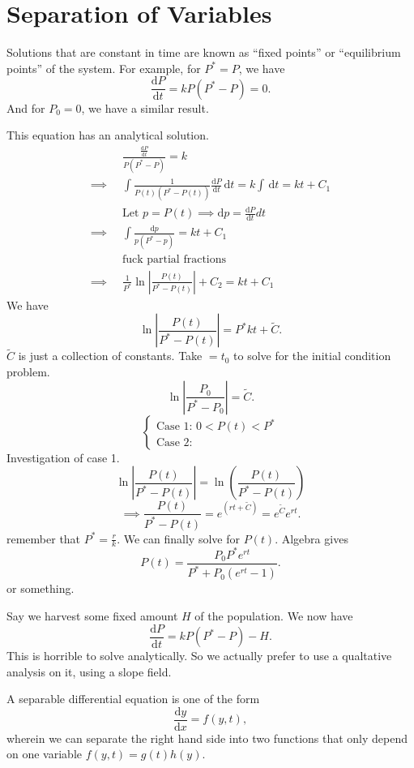 \section{Separation of Variables}
Solutions that are constant in time are known as ``fixed points'' or ``equilibrium points'' of the system. For example, for $P^*= P$, we have
\[
	\frac{\mathrm{d}P}{\mathrm{d}t} =kP(P^*-P)=0
.\]
And for $P_0=0$, we have a similar result.

This equation has an analytical solution.
\begin{align*}
	\qquad& \frac{\frac{\mathrm{d}P}{\mathrm{d}t} }{P\left( P^* - P \right) }=k\\
	\implies& \int \frac{1}{P(t)\left( P^*-P(t) \right) }\frac{\mathrm{d}P}{\mathrm{d}t}  \,\mathrm{d} t=k\int  \,\mathrm{d} t = kt+C_1\\
		&\text{Let }p=P(t) \implies\mathrm{d} p=\frac{\mathrm{d}P}{\mathrm{d}t} dt\\
	\implies&\int \frac{\mathrm{d}p }{p\left( P^*-p \right) }=kt+C_1\\
		&\text{fuck partial fractions}\\
	\implies&\frac{1}{P^*}\ln \left| \frac{P(t)}{P^*-P(t)} \right| +C_2=kt+C_1
\end{align*}
We have
\[
	\ln \left| \frac{P(t)}{P^*-P(t)} \right| =P^*kt+\tilde{C}
.\]
$\tilde{C}$ is just a collection of constants. Take $=t_0$ to solve for the initial condition problem.
\[
	\ln \left| \frac{P_0}{P^*-P_0} \right| =\tilde{C}
.\]
\[
\begin{cases}
	\text{Case 1: }0<P(t)<P^*\\
	\text{Case 2: }
\end{cases}
\]
Investigation of case 1.
\[
	\ln \left| \frac{P(t)}{P^*-P(t)} \right| =\ln \left( \frac{P(t)}{P^*-P(t)} \right) 
\]
\[
	\implies \frac{P(t)}{P^*-P(t)}=e^{(rt+\tilde{C})}=e^{\tilde{C}}e^{rt}
.\]
remember that $P^* = \frac{r}{k}$. We can finally solve for $P(t)$. Algebra gives
\[
	P(t)=\frac{P_0P^*e^{rt}}{P^*+P_0\left( e^{rt}-1 \right) }
.\]
or something.

Say we harvest some fixed amount $H$ of the population. We now have
\[
	\frac{\mathrm{d}P}{\mathrm{d}t} =kP\left( P^*-P \right) -H
.\]
This is horrible to solve analytically. So we actually prefer to use a qualtative analysis on it, using a slope field.
\begin{definition}\label{dfn:4}
	A separable differential equation is one of the form
	\[
		\frac{\mathrm{d}y}{\mathrm{d}x} =f(y,t)
	,\]
	wherein we can separate the right hand side into two functions that only depend on one variable $f(y,t)=g(t)h(y)$.
\end{definition}

